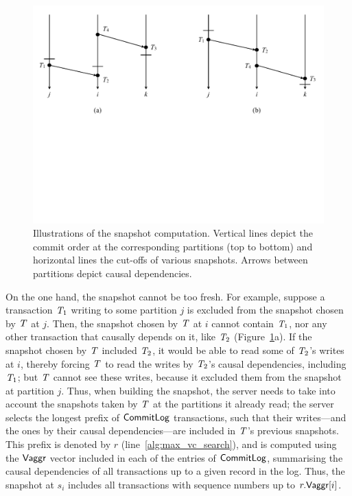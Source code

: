 \begin{figure}[t]
\includegraphics[width=\textwidth]{figures/ch4_snapshot.pdf}
\vspace{-6.5cm}
\caption{Illustrations of the snapshot computation. Vertical lines depict the
  commit order at the corresponding partitions (top to bottom) and horizontal
  lines the cut-offs of various snapshots. Arrows between partitions depict
  causal dependencies.}
\label{fig:snapshot}
\end{figure}

On the one hand, the snapshot cannot be too fresh. For example, suppose a transaction $\mathit{T}_1$ writing to some partition $j$ is excluded from the snapshot chosen by $\mathit{T}$ at $j$. Then, the snapshot chosen by $\mathit{T}$ at $i$ cannot contain $\mathit{T}_1$, nor any other transaction that causally depends on it, like $\mathit{T}_2$ (Figure~\ref{fig:snapshot}a). If the snapshot chosen by $\mathit{T}$ included $\mathit{T}_2$, it would be able to read some of $\mathit{T}_2$'s writes at $i$, thereby forcing $\mathit{T}$ to read the writes by $\mathit{T}_2$'s causal dependencies, including $\mathit{T}_1$; but $\mathit{T}$ cannot see these writes, because it excluded them from the snapshot at partition $j$. Thus, when building the snapshot, the server needs to take into account the snapshots taken by $\mathit{T}$ at the partitions it already read; the server selects the longest prefix of $\mathsf{CommitLog}$ transactions, such that their writes---and the ones by their causal dependencies---are included in $\mathit{T}$'s previous snapshots. This prefix is denoted by $r$ (line~\ref{alg:max_vc_search}), and is computed using the $\mathsf{Vaggr}$ vector included in each of the entries of $\mathsf{CommitLog}$, summarising the causal dependencies of all transactions up to a given record in the log. Thus, the snapshot at $s_i$ includes all transactions with sequence numbers up to $r.\mathsf{Vaggr}[i]$.

